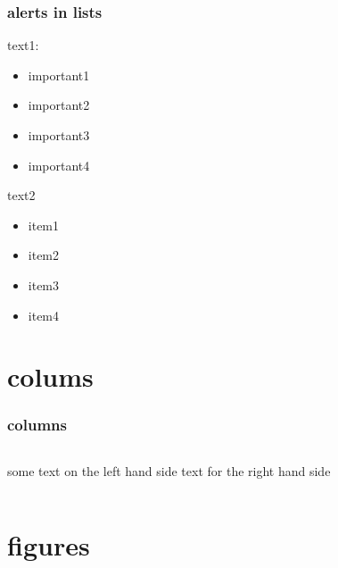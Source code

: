 \documentclass{beamer}
\begin{document}
% 
\begin{frame}
\frametitle{alerts in lists}

text1:
\begin{itemize}[<+-| alert@+>]
\item important1
\item important2
\item important3
\item important4
\end{itemize}

text2
\begin{itemize}
\item<alert@5> item1
\item<alert@6> item2
\item<alert@7> item3
\item<alert@8> item4
\end{itemize}

\end{frame}

% 
\section{colums}
\begin{frame}
  \tableofcontents[currentsection]
\end{frame}

% 
\begin{frame}
  \frametitle{columns}
  \begin{columns}
    \column{6cm}
    some text on the left hand side
    \column{4cm}
    text for the right hand side
  \end{columns}
\end{frame}

% 
\section{figures}
\begin{frame}
  \tableofcontents[currentsection]
\end{frame}
\end{document}
